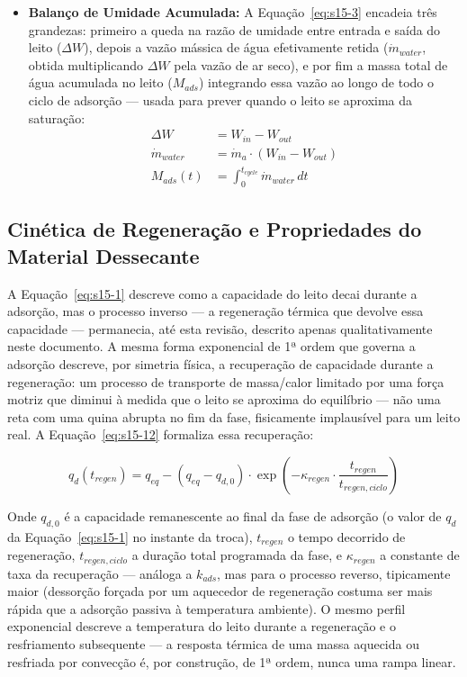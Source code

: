 \documentclass[12pt,a4paper]{article}
\numberwithin{equation}{section}
\numberwithin{table}{section}
\numberwithin{figure}{section}
\begin{document}
{\begin{itemize}
			\item \textbf{Balanço de Umidade Acumulada:} A Equação~\eqref{eq:s15-3} encadeia três grandezas: primeiro a queda na razão de umidade entre entrada e saída do leito ($\Delta W$), depois a vazão mássica de água efetivamente retida ($\dot{m}_{water}$, obtida multiplicando $\Delta W$ pela vazão de ar seco), e por fim a massa total de água acumulada no leito ($M_{ads}$) integrando essa vazão ao longo de todo o ciclo de adsorção — usada para prever quando o leito se aproxima da saturação:
			\begin{equation}\label{eq:s15-3}
			\begin{aligned}
				\Delta W &= W_{in} - W_{out} \\[4pt]
				\dot{m}_{water} &= \dot{m}_a \cdot (W_{in} - W_{out}) \\[4pt]
				M_{ads}(t) &= \int_0^{t_{cycle}} \dot{m}_{water} \, dt
			\end{aligned}
\end{equation}
		\end{itemize}

		\subsection{\textbf{Cinética de Regeneração e Propriedades do Material Dessecante}}

		A Equação~\eqref{eq:s15-1} descreve como a capacidade do leito decai durante a adsorção, mas o processo inverso — a regeneração térmica que devolve essa capacidade — permanecia, até esta revisão, descrito apenas qualitativamente neste documento. A mesma forma exponencial de 1ª ordem que governa a adsorção descreve, por simetria física, a recuperação de capacidade durante a regeneração: um processo de transporte de massa/calor limitado por uma força motriz que diminui à medida que o leito se aproxima do equilíbrio — não uma reta com uma quina abrupta no fim da fase, fisicamente implausível para um leito real. A Equação~\eqref{eq:s15-12} formaliza essa recuperação:

		\begin{equation}\label{eq:s15-12}
		q_d(t_{regen}) = q_{eq} - \left(q_{eq} - q_{d,0}\right) \cdot \exp\left(-\kappa_{regen} \cdot \frac{t_{regen}}{t_{regen,ciclo}}\right)
		\end{equation}

		Onde $q_{d,0}$ é a capacidade remanescente ao final da fase de adsorção (o valor de $q_d$ da Equação~\eqref{eq:s15-1} no instante da troca), $t_{regen}$ o tempo decorrido de regeneração, $t_{regen,ciclo}$ a duração total programada da fase, e $\kappa_{regen}$ a constante de taxa da recuperação — análoga a $k_{ads}$, mas para o processo reverso, tipicamente maior (dessorção forçada por um aquecedor de regeneração costuma ser mais rápida que a adsorção passiva à temperatura ambiente). O mesmo perfil exponencial descreve a temperatura do leito durante a regeneração e o resfriamento subsequente — a resposta térmica de uma massa aquecida ou resfriada por convecção é, por construção, de 1ª ordem, nunca uma rampa linear.

}
\end{document}
